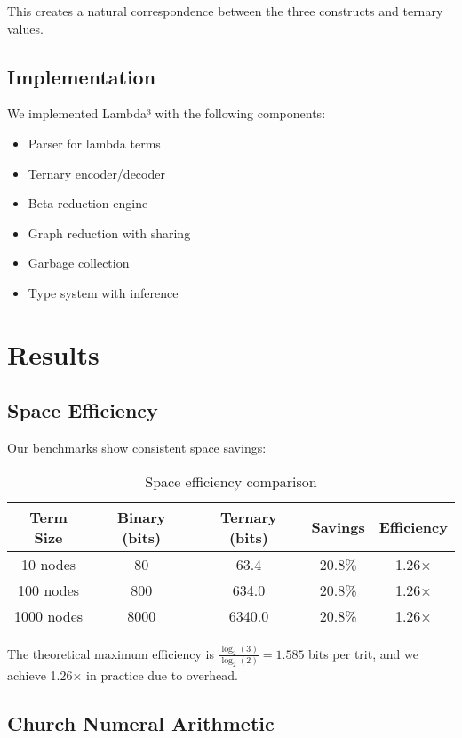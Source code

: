 \documentclass[11pt]{article}
\begin{document}
This creates a natural correspondence between the three constructs and ternary values.

\subsection{Implementation}

We implemented Lambda³ with the following components:
\begin{itemize}
    \item Parser for lambda terms
    \item Ternary encoder/decoder
    \item Beta reduction engine
    \item Graph reduction with sharing
    \item Garbage collection
    \item Type system with inference
\end{itemize}

\section{Results}

\subsection{Space Efficiency}

Our benchmarks show consistent space savings:

\begin{table}[h]
\centering
\begin{tabular}{|c|c|c|c|c|}
\hline
Term Size & Binary (bits) & Ternary (bits) & Savings & Efficiency \\
\hline
10 nodes & 80 & 63.4 & 20.8\% & 1.26× \\
100 nodes & 800 & 634.0 & 20.8\% & 1.26× \\
1000 nodes & 8000 & 6340.0 & 20.8\% & 1.26× \\
\hline
\end{tabular}
\caption{Space efficiency comparison}
\end{table}

The theoretical maximum efficiency is $\frac{\log_2(3)}{\log_2(2)} = 1.585$ bits per trit, and we achieve 1.26× in practice due to overhead.

\subsection{Church Numeral Arithmetic}
\end{document}
